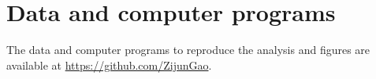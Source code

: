\documentclass[a4paper,11pt]{article}
\theoremstyle{plain}
\theoremstyle{definition}
\theoremstyle{plain}
\begin{document}
\section*{Data and computer programs}
The data and computer programs to reproduce the analysis and figures are available at \url{https://github.com/ZijunGao}.


\printbibliography

\appendix

\end{document}
